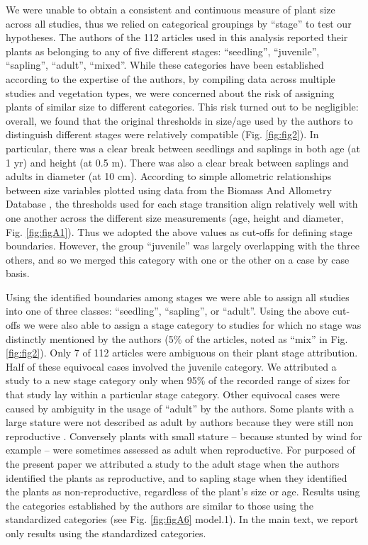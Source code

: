 \documentclass[a4paper,11pt]{article}
\begin{document}
We were unable to obtain a consistent and continuous measure of plant size across all studies, thus we relied on categorical groupings by ``stage'' to test our hypotheses. The authors of the 112 articles used in this analysis reported their plants as belonging to any of five different stages: ``seedling'', ``juvenile'', ``sapling'', ``adult'', ``mixed''. While these categories have been established according to the expertise of the authors, by compiling data across multiple studies and vegetation types, we were concerned about the risk of assigning plants of similar size to different categories. This risk turned out to be negligible: overall, we found that the original thresholds in size/age used by the authors to distinguish different stages were relatively compatible (Fig. \ref{fig:fig2}). In particular, there was a clear break between seedlings and saplings in both age (at 1 yr) and height (at 0.5 m). There was also a clear break between saplings and adults in diameter (at 10 cm). According to simple allometric relationships between size variables plotted using data from the Biomass And Allometry Database \citep{Falster:2015}, the thresholds used for each stage transition align relatively well with one another across the different size measurements (age, height and diameter, Fig. \ref{fig:figA1}). Thus we adopted the above values as cut-offs for defining stage boundaries. However, the group ``juvenile'' was largely overlapping with the three others, and so we merged this category with one or the other on a case by case basis.

Using the identified boundaries among stages we were able to assign all studies into one of three classes: ``seedling'', ``sapling'', or ``adult''. Using the above cut-offs we were also able to assign a stage category to studies for which no stage was distinctly mentioned by the authors (5\% of the articles, noted as ``mix'' in Fig. \ref{fig:fig2}). Only 7 of 112 articles were ambiguous on their plant stage attribution. Half of these equivocal cases involved the juvenile category. We attributed a study to a new stage category only when 95\% of the recorded range of sizes for that study lay within a particular stage category. Other equivocal cases were caused by ambiguity in the usage of ``adult'' by the authors. Some plants with a large stature were not described as adult by authors because they were still non reproductive \citep{King:2006dg,King:2006he}. Conversely plants with small stature -- because stunted by wind for example \citep{Stratton:2001ck}-- were sometimes assessed as adult when reproductive. For purposed of the present paper we attributed a study to the adult stage when the authors identified the plants as reproductive, and to sapling stage when they identified the plants as non-reproductive, regardless of the plant's size or age. Results using the categories established by the authors are similar to those using the standardized categories (see Fig. \ref{fig:figA6} model.1). In the main text, we report only results using the standardized categories.
\end{document}

